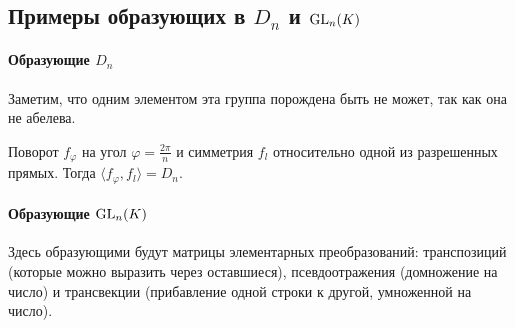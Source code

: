 \subsection{Примеры образующих в $ D_n$ и  $ {\mathop{\text{\rm GL}}}_n(K)$}
\paragraph{Образующие $ D_n$}
Заметим, что одним элементом эта группа порождена быть не может, так как она не абелева. 
\begin{st}
    Поворот $ f_{\varphi } $ на угол $ \varphi = \frac{2\pi}{n}$ и симметрия $ f_l$ относительно одной из разрешенных прямых. Тогда  $ \langle f_{\varphi }, f_l \rangle = D_n$.
\end{st}
\paragraph{Образующие $ {\mathop{\text{\rm GL}}}_n(K)$}
Здесь образующими будут матрицы элементарных преобразований: транспозиций (которые можно выразить через оставшиеся), псевдоотражения (домножение на число) и трансвекции (прибавление одной строки к другой, умноженной на число).
% 
